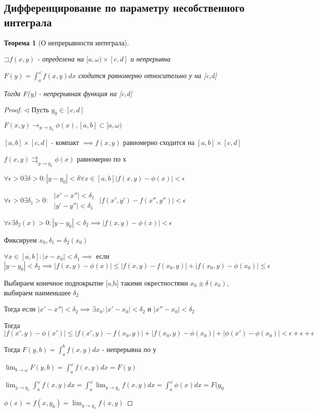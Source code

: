 \documentclass[a4paper]{article}
\newcommand\letsymbol{\mathord{\sqsupset}}
\newtheorem{theorem}{Теорема}[section]
\theoremstyle{definition}
\theoremstyle{remark}
\begin{document}
    \subsection{	Дифференцирование  по параметру несобственного интеграла}
    \begin{theorem}[О непрерывности интеграла] \hypertarget{p5}{}
     $\letsymbol f(x,y)$ - определена на $[a,\omega)\times[c, d]$ и непрерывна

     $F(y) = \int_a^\omega f(x,y)dx$ сходится равномерно относительно у на [c,d]

     Тогда F(y) - непрерывная функция на [c,d]
\end{theorem}
\begin{proof}
     $\triangleleft$ Пусть $y_0\in[c,d]$
     
     $F(x,y)\rightarrow_{y\to y_0} \phi(x), [a, b]\subset [a,\omega)$
     
     $[a,b] \times [c,d]$ - компакт $\implies f(x,y)$ равномерно сходится на $[a,b] \times [c,d]$
     
     $f(x,y)\rightrightarrows_{y\to y_0} \phi(x)$ равномерно по х
     
     $\forall \epsilon > 0 \exists \delta>0: |y-y_0|< \delta \forall x\in [a,b] |f(x,y) - \phi(x)|< \epsilon$
     
     
     $\forall \epsilon > 0 \exists \delta_1>0:$
     $
               \begin{array}{l}
                    |x' - x''|< \delta_1\\
                    |y' - y''|<\delta_1
               \end{array}
               $
               $|f(x',y') - f(x'',y'')|<\epsilon$
     
     $\forall \epsilon \exists \delta_2(x)>0: |y - y_0|<\delta_2 \implies |f(x,y)-\phi(x)|<\epsilon$
     
     Фиксируем $x_0, \delta_1 = \delta_2(x_0)$
     
     $\forall x \in [a, b]: |x - x_0|< \delta_1\implies$ если $|y-y_0|< \delta_2 \implies|f(x,y) - \phi(x)|\leq |f(x,y) -f(x_0,y)|+|f(x_0, y) - \phi(x_0)|\leq\epsilon$
     
     Выбираем конечное подпокрытие [a,b] такими окрестностями $x_0\pm \delta(x_0),$ выбираем наименьшее $\delta_2$
     
     Тогда если $|x' - x''|<\delta_2\implies\exists x_0: |x' - x_0|<\delta_2$ и $|x'' - x_0|< \delta_2$
     
     Тогда $|f(x',y) - \phi(x')|\leq |f(x',y) - f(x_0,y)|+|f(x_0, y) - \phi(x_0)|+|\phi(x') - \phi(x_0)| < \epsilon+\epsilon+\epsilon$
     
     Тогда $F(y, b) = \int_a^b f(x,y)dx $ - непрерывна по у
     
     $\lim_{b \to \omega} F(y,b)  = \int_a^\omega f(x,y)dx = F(y)$
     
     $\lim_{y \to y_0} \int_a^\omega f(x,y)dx = \int_a^\omega \lim_{y \to y_0} f(x,y)dx  = \int_a^\omega\phi(x)dx = F(y_0$
     
     $\phi(x) = f(x,y_0) = \lim_{y\to y_0} f(x,y)$
     
     \end{proof}
\end{document}
